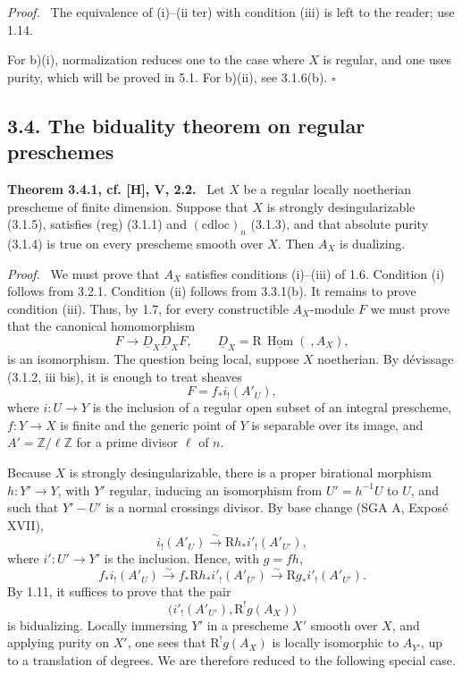 \documentclass[11pt]{article}
\theoremstyle{plain}
\theoremstyle{definition}
\theoremstyle{remark}
\newenvironment{statement}[1]{\par\medskip\noindent\textbf{#1.}\ }{\par\medskip}
\newenvironment{prooftext}{\par\noindent\textit{Proof.}\ }{\par\medskip}
\newcommand{\ZZ}{\mathbb Z}
\DeclareMathOperator{\Hom}{Hom}
\newcommand{\R}{\mathrm R}
\newcommand{\qedtext}{\hfill$\square$}
\begin{document}
\begin{prooftext}
The equivalence of (i)--(ii ter) with condition (iii) is left to the reader; use 1.14.

For b)(i), normalization reduces one to the case where $X$ is regular, and one uses purity, which will be proved in 5.1. For b)(ii), see 3.1.6(b). \qedtext
\end{prooftext}

\subsection*{3.4. The biduality theorem on regular preschemes}

\begin{statement}{Theorem 3.4.1, cf. [H], V, 2.2}
Let $X$ be a regular locally noetherian prescheme of finite dimension. Suppose that $X$ is strongly desingularizable (3.1.5), satisfies (reg) (3.1.1) and $(\mathrm{cdloc})_n$ (3.1.3), and that absolute purity (3.1.4) is true on every prescheme smooth over $X$. Then $A_X$ is dualizing.
\end{statement}

\begin{prooftext}
We must prove that $A_X$ satisfies conditions (i)--(iii) of 1.6. Condition (i) follows from 3.2.1. Condition (ii) follows from 3.3.1(b). It remains to prove condition (iii). Thus, by 1.7, for every constructible $A_X$-module $F$ we must prove that the canonical homomorphism
\[
   F\longrightarrow \underline D_X\underline D_XF,
   \qquad \underline D_X=\R\,\underline{\Hom}(\ ,A_X),
\]
is an isomorphism. The question being local, suppose $X$ noetherian. By dévissage (3.1.2, iii bis), it is enough to treat sheaves
\[
   F=f_*i_!(A'_U),
\]
where $i:U\to Y$ is the inclusion of a regular open subset of an integral prescheme, $f:Y\to X$ is finite and the generic point of $Y$ is separable over its image, and $A'=\ZZ/\ell\ZZ$ for a prime divisor $\ell$ of $n$.

Because $X$ is strongly desingularizable, there is a proper birational morphism $h:Y'\to Y$, with $Y'$ regular, inducing an isomorphism from $U'=h^{-1}U$ to $U$, and such that $Y'-U'$ is a normal crossings divisor. By base change (SGA A, Exposé XVII),
\[
   i_!(A'_U)\xrightarrow{\sim}\R h_*i'_!(A'_{U'}),
\]
where $i':U'\to Y'$ is the inclusion. Hence, with $g=fh$,
\[
   f_*i_!(A'_U)
     \xrightarrow{\sim} f_*\R h_*i'_!(A'_{U'})
     \xrightarrow{\sim} \R g_*i'_!(A'_{U'}).
\]
By 1.11, it suffices to prove that the pair
\[
   \bigl(i'_!(A'_{U'}),\R^!g(A_X)\bigr)
\]
is bidualizing. Locally immersing $Y'$ in a prescheme $X'$ smooth over $X$, and applying purity on $X'$, one sees that $\R^!g(A_X)$ is locally isomorphic to $A_{Y'}$, up to a translation of degrees. We are therefore reduced to the following special case.
\end{prooftext}
\end{document}

